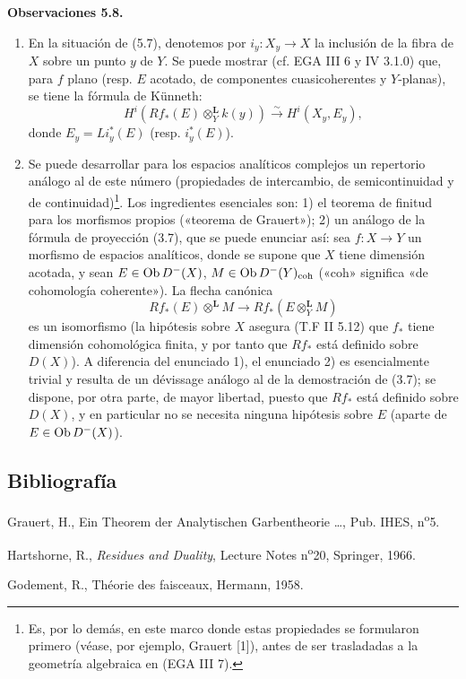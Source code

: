 \providecommand{\sisi}[2]{#2}

\textbf{Observaciones 5.8.}
\begin{enumerate}[label=\alph*)]
\item En la situación de (5.7), denotemos por \(i_y:X_y\to X\) la inclusión de la fibra de \(X\) sobre un punto \(y\) de \(Y\). Se puede mostrar \sisi{(cf. (EGA III 6 et (IV 3.1.0)}{(cf. EGA III 6 y IV 3.1.0)} que, para \(f\) plano (resp. \(E\) acotado, de componentes cuasicoherentes y \(Y\)-planas), se tiene la fórmula de Künneth:
\[
 H^i(Rf_*(E)\otimes_Y^{\mathbf L}k(y))\xrightarrow{\sim}H^i(X_y,E_y),
\]
donde \(E_y=Li_y^*(E)\) (resp. \(i_y^*(E)\)).
\item Se puede desarrollar para los espacios analíticos complejos un repertorio análogo al de este número (propiedades de intercambio, de semicontinuidad y de continuidad)\footnote{Es, por lo demás, en este marco donde estas propiedades se formularon primero (véase, por ejemplo, Grauert [1]), antes de ser trasladadas a la geometría algebraica en (EGA III 7).}. Los ingredientes esenciales son: 1) el teorema de finitud para los morfismos propios («teorema de Grauert»); 2) un análogo de la fórmula de proyección (3.7), que se puede enunciar así: sea \(f:X\to Y\) un morfismo de espacios analíticos, donde se supone que \(X\) tiene dimensión acotada, y sean \(E\in\operatorname{Ob} D^-(X)\), \(M\in\operatorname{Ob} D^-(Y)_{\mathrm{coh}}\) («coh» significa «de cohomología coherente»). La flecha canónica
\[
 \sisi{Rf_*(E)\otimes^{\mathbf L}M)}{Rf_*(E)\otimes^{\mathbf L}M}\longrightarrow Rf_*(E\otimes_Y^{\mathbf L}M)
\]
es un isomorfismo (la hipótesis sobre \(X\) asegura (T.F II 5.12) que \(f_*\) tiene dimensión cohomológica finita, y por tanto que \(Rf_*\) está definido sobre \(D(X)\)). A diferencia del enunciado 1), el enunciado 2) es esencialmente trivial y resulta de un dévissage análogo al de la demostración de (3.7); se dispone, por otra parte, de mayor libertad, puesto que \(Rf_*\) está definido sobre \(D(X)\), y en particular no se necesita ninguna hipótesis sobre \(E\) (aparte de \(E\in\operatorname{Ob} D^-(X)\)).
\end{enumerate}

\subsection*{Bibliografía}
\begin{enumerate}[label={[\arabic*]}]
\item[{[1]}] Grauert, H., Ein Theorem der Analytischen Garbentheorie \ldots, Pub. IHES, n\textsuperscript{o}5.
\item[{[H]}] Hartshorne, R., \emph{Residues and Duality}, Lecture Notes n\textsuperscript{o}20, Springer, 1966.
\item[{[T.F]}] Godement, R., Théorie des faisceaux, Hermann, 1958.
\end{enumerate}



